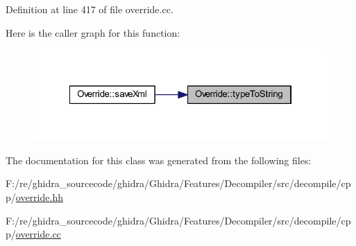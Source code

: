 Definition at line 417 of file override.\+cc.

Here is the caller graph for this function\+:
\nopagebreak
\begin{figure}[H]
\begin{center}
\leavevmode
\includegraphics[width=322pt]{class_override_a33a4d3c7956892c27e2ab851c04bd6b7_icgraph}
\end{center}
\end{figure}


The documentation for this class was generated from the following files\+:\begin{DoxyCompactItemize}
\item 
F\+:/re/ghidra\+\_\+sourcecode/ghidra/\+Ghidra/\+Features/\+Decompiler/src/decompile/cpp/\mbox{\hyperlink{override_8hh}{override.\+hh}}\item 
F\+:/re/ghidra\+\_\+sourcecode/ghidra/\+Ghidra/\+Features/\+Decompiler/src/decompile/cpp/\mbox{\hyperlink{override_8cc}{override.\+cc}}\end{DoxyCompactItemize}
